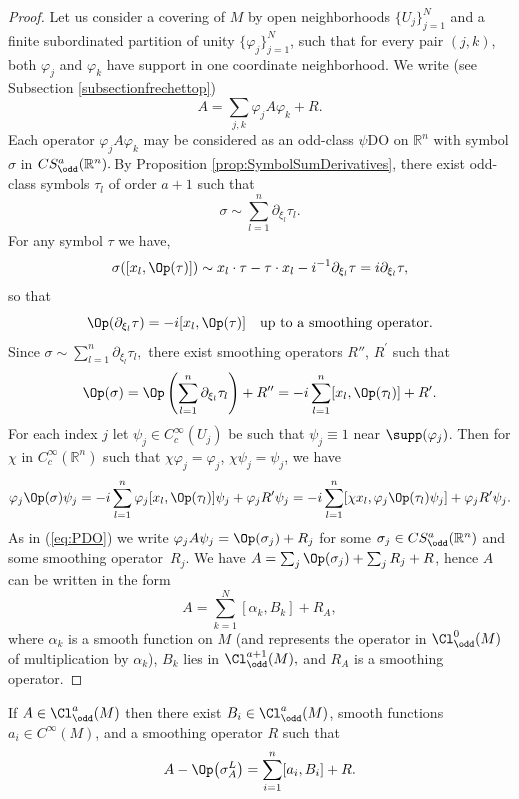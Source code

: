 \begin{proof}
Let us consider a covering of $M$ by open neighborhoods $\{U_j\}_{j=1}^N$ and a f\/inite subordinated partition of unity $\{\varphi_j\}_{j=1}^N$, such that for every pair $(j,k)$, both $\varphi_j$ and $\varphi_k$ have support in one coordinate neighborhood. We write (see Subsection \ref{subsectionfrechettop})
\[
A=\sum_{j,k}\varphi_jA\varphi_k+R.
\]
Each operator $\varphi_jA\varphi_k$ may be considered as an odd-class $\psi$DO on $\mathbb{R}^n$ with symbol $\sigma$ in $CS^a_{\odd}(\mathbb{R}^n).\!$ By Proposition \ref{prop:SymbolSumDerivatives}, there exist odd-class symbols $\tau_l$ of order $a+1$ such that
\[
\sigma\sim\sum\limits_{l=1}^n\partial_{\xi_l}\tau_l.
\]
For any symbol $\tau$ we have,
\[
\sigma([x_l,\Op(\tau)])\sim x_l\cdot \tau-\tau\cdot x_l-i^{-1}\partial_{\xi_l}\tau =i\partial_{\xi_l}\tau,
\]
so that
\[
\Op(\partial_{\xi_l}\tau)=-i[x_l,\Op(\tau)] \quad {\rm up\ to\ a\ smoothing\ operator.}
\]
Since $\sigma\sim\sum\limits_{l=1}^n\partial_{\xi_l}\tau_l,$ there exist smoothing operators $R''$, $R^\prime$ such that
\[
\Op(\sigma)=\Op\left(\sum\limits_{l=1}^n\partial_{\xi_l}\tau_l\right)+R''=-i\sum\limits_{l=1}^n [x_l,\Op(\tau_l)]+R^\prime.
\]
For each index $j$ let $\psi_j\in C_c^\infty(U_j)$ be such that $\psi_j\equiv1$ near $\supp(\varphi_j)$. Then for $\chi$ in $C_c^\infty(\mathbb{R}^n)$ such that $\chi\varphi_j=\varphi_j$, $\chi\psi_j=\psi_j$, we have
\begin{gather*}
\varphi_j\Op(\sigma)\psi_j
 =-i\sum\limits_{l=1}^n\varphi_j[x_l,\Op(\tau_l)]\psi_j+\varphi_jR^\prime\psi_j
 =-i\sum\limits_{l=1}^n [\chi x_l,\varphi_j\Op(\tau_l)\psi_j]+\varphi_jR^\prime\psi_j.
\end{gather*}
As in (\ref{eq:PDO}) we write $\varphi_j A \psi_j= \Op(\sigma_{j}) +R_{j}$ for some $\sigma_j\in CS^{a}_{\odd}(\mathbb{R}^n)$ and some smoothing ope\-ra\-tor~$R_{j}$. We have $A= \sum _{j}\Op(\sigma_{j})+\sum _{j}R_{j}+R$, hence $A$ can be written in the form
\[
A=\sum\limits_{k=1}^{N}[\alpha_k,B_k]+R_A,
\]
where $\alpha_k$ is a smooth function on $M$ (and represents the operator in $\Cl^{0}_{\odd}(M)$ of multiplication by $\alpha_k$), $B_k$ lies in $\Cl^{a+1}_{\odd}(M),$ and $R_A$ is a smoothing operator.
\end{proof}

\begin{corollary}\label{corol2}
If $A\in \Cl^{a}_{\odd}(M)$ then there exist $B_i\in \Cl^{a}_{\odd}(M)$, smooth functions $a_i\in C^\infty(M)$, and a smoothing operator $R$ such that
\[
A-\Op\big(\sigma_A^L\big)=\sum_{i=1}^n[a_i,B_i]+R.
\]
\end{corollary}

